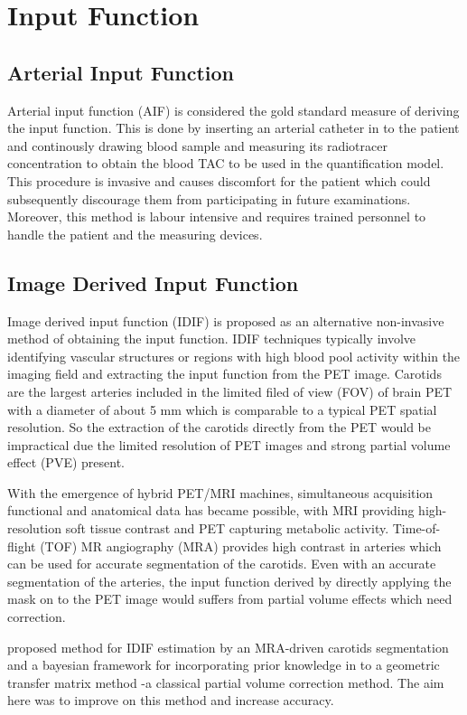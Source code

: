 \section{Input Function}
\subsection{Arterial Input Function}
Arterial input function (AIF) is considered the gold standard measure of deriving the input function.
This is done by inserting an arterial catheter in to the patient and continously drawing blood sample and measuring its radiotracer concentration to obtain the blood TAC to be used in the quantification model.
This procedure is invasive and causes discomfort for the patient which could subsequently discourage them from participating in future examinations.
Moreover, this method is labour intensive and requires trained personnel to handle the patient and the measuring devices.

\subsection{Image Derived Input Function}
Image derived input function (IDIF) is proposed as an alternative non-invasive method of obtaining the input function.
IDIF techniques typically involve identifying vascular structures or regions with high blood pool activity within the imaging field and extracting the input function from the PET image.
Carotids are the largest arteries included in the limited filed of view (FOV) of brain PET with a diameter of about 5 mm which is comparable to a typical PET spatial resolution.
So the extraction of the carotids directly from the PET would be impractical due the limited resolution of PET images and strong partial volume effect (PVE) present.

With the emergence of hybrid PET/MRI machines, simultaneous acquisition functional and anatomical data has became possible, with MRI providing high-resolution soft tissue contrast and PET capturing metabolic activity.
Time-of-flight (TOF) MR angiography (MRA) provides high contrast in arteries which can be used for accurate segmentation of the carotids.
Even with an accurate segmentation of the arteries, the input function derived by directly applying the mask on to the PET image would suffers from partial volume effects which need correction.


\citeauthor{irace2021bayesian} \cite{irace2021bayesian} proposed method for IDIF estimation by an MRA-driven carotids segmentation and a bayesian framework for incorporating prior knowledge in to a geometric transfer matrix method -a classical partial volume correction method. The aim here was to improve on this method and increase accuracy.
